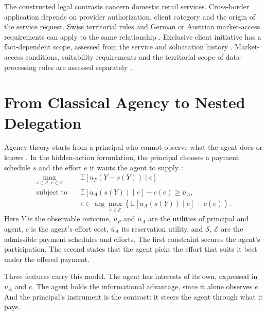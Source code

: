 \documentclass[oneside,10pt,english]{swissi}
\begin{document}
The constructed legal contrasts concern domestic retail services. Cross-border application depends on provider authorization, client category and the origin of the service request. Swiss territorial rules and German or Austrian market-access requirements can apply to the same relationship \parencites[art.~2]{switzerland2019finso}[sec.~15]{germany2021wpig15}[sec.~32]{germany1961kwg32}[secs.~21, 23--24]{austria2018wagcrossborder}. Exclusive client initiative has a fact-dependent scope, assessed from the service and solicitation history \parencite{esma2021reversesolicitation}. Market-access conditions, suitability requirements and the territorial scope of data-processing rules are assessed separately \parencites[art.~3]{europeanunion2016gdpr}[art.~3]{switzerland2020fadp}.

\section{From Classical Agency to Nested Delegation}\label{sec:theory}

Agency theory starts from a principal who cannot observe what the agent does or knows \parencite{jensen1976theory}. In the hidden-action formulation, the principal chooses a payment schedule $s$ and the effort $e$ it wants the agent to supply \parencite[pp.~75--76, eqs.~(1)--(3)]{holmstrom1979moral}:
\begin{equation}
 \begin{aligned}
 \max_{s\in\mathcal S,\,e\in\mathcal E}\quad&
 \mathbb E\!\left[u_P(Y-s(Y))\mid e\right]\\
 \text{subject to}\quad&
 \mathbb E\!\left[u_A(s(Y))\mid e\right]-c(e)\ge\bar u_A,\\
 &e\in\arg\max_{\tilde e\in\mathcal E}
 \left\{\mathbb E\!\left[u_A(s(Y))\mid\tilde e\right]-c(\tilde e)\right\}.
 \end{aligned}
 \label{eq:classical-agency}
\end{equation}
Here $Y$ is the observable outcome, $u_P$ and $u_A$ are the utilities of principal and agent, $c$ is the agent's effort cost, $\bar u_A$ its reservation utility, and $\mathcal S$, $\mathcal E$ are the admissible payment schedules and efforts. The first constraint secures the agent's participation. The second states that the agent picks the effort that suits it best under the offered payment.

Three features carry this model. The agent has interests of its own, expressed in $u_A$ and $c$. The agent holds the informational advantage, since it alone observes $e$. And the principal's instrument is the contract: it steers the agent through what it pays.
\end{document}
